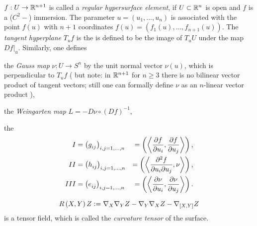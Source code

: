 \documentclass[../main.tex]{subfiles}
\begin{document}
\begin{definition}\label{Manifold:Hypersurface}
    $f:U\to\mathbb{R}^{n+1}$ is called a \textit{regular hypersurface element},
    if $U\subset\mathbb{R}^n$ is open and $f$ is a ($C^2-$) immersion.
    The parameter $u=\left(u_1,\dots,u_n\right)$ is associated with the point $f(u)$
    with $n+1$ coordinates $f(u)=\left(f_1(u),\dots,f_{n+1}(u)\right)$.
    The \textit{tangent hyperplane} $T_uf$ is the is defined to be the image of $T_uU$ under the map $\left.Df\right|_u$.
    Similarly, one defines
    \begin{APAitemize}
        \item the \textit{Gauss map} $\nu:U\to S^n$ by the unit normal vector $\nu(u)$,
        which is perpendicular to $T_uf$
        (
        but note: in $\mathbb{R}^{n+1}$ for $n\ge3$ there is no bilinear vector product of tangent vectors;
        still one can formally define $\nu$ as an $n$-linear vector product
        ),
        \item the \textit{Weingarten map} $L=-D\nu\circ\left(Df\right)^{-1}$,
        \item the 
        \begin{align*}
            I   & = \left(\tensor{g}{_i_j}\right)_{i,j=1,\dots,n} & = \left(\inner{\frac{\partial f}{\partial u_i}}{\frac{\partial f}{\partial u_j}}\right)\text{,}     \\
            II  & = \left(\tensor{h}{_i_j}\right)_{i,j=1,\dots,n} & = \left(\inner{\frac{\partial^2 f}{\partial u_i\partial u_j}}{\nu}\right)\text{,}                   \\
            III & = \left(\tensor{e}{_i_j}\right)_{i,j=1,\dots,n} & = \left(\inner{\frac{\partial \nu}{\partial u_i}}{\frac{\partial \nu}{\partial u_j}}\right)\text{.} \\
        \end{align*}
    \end{APAitemize}
\end{definition}
\begin{definition}\label{Manifold:CurvatureTensor}
    \begin{equation*}
        R\left(X,Y\right)Z
        \vcentcolon=
        \nabla_X\nabla_YZ - \nabla_Y\nabla_XZ - \nabla_{\left[{X},{Y}\right]}Z
    \end{equation*}
    is a tensor field, which is called the \textit{curvature tensor} of the surface.
\end{definition}
\end{document}
